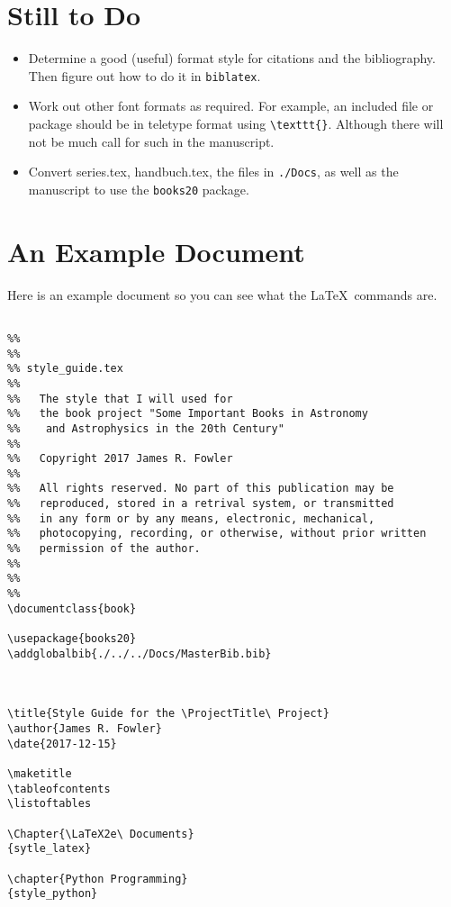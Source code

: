 \section{Still to Do}

\begin{itemize}

\item Determine a good (useful) format style for citations and the
  bibliography.  Then figure out how to do it in \texttt{biblatex}.

\item Work out other font formats as required. For example, an included
  file or package should be in teletype format using \verb|\texttt{}|.
  Although there will not be much call for such in the manuscript.

\item Convert series.tex, handbuch.tex, the files in \texttt{./Docs}, as
  well as the manuscript to use the \texttt{books20} package.

\end{itemize}

\section{An Example Document}

Here is an example document so you can see what the \LaTeX\ commands are.

\begin{verbatim}

%%
%%
%% style_guide.tex
%%
%%   The style that I will used for 
%%   the book project "Some Important Books in Astronomy
%%    and Astrophysics in the 20th Century"
%%
%%   Copyright 2017 James R. Fowler
%%
%%   All rights reserved. No part of this publication may be
%%   reproduced, stored in a retrival system, or transmitted
%%   in any form or by any means, electronic, mechanical,
%%   photocopying, recording, or otherwise, without prior written
%%   permission of the author.
%%
%%
%%
\documentclass{book}

\usepackage{books20}
\addglobalbib{./../../Docs/MasterBib.bib}



\title{Style Guide for the \ProjectTitle\ Project}
\author{James R. Fowler}
\date{2017-12-15}

\maketitle
\tableofcontents
\listoftables 

\Chapter{\LaTeX2e\ Documents}
{sytle_latex}

\chapter{Python Programming}
{style_python}


\end{verbatim}

